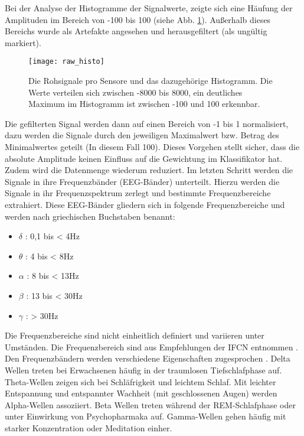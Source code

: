 Bei der Analyse der Histogramme der Signalwerte, zeigte sich eine Häufung der Amplituden im Bereich von -100 bis 100 (siehe Abb. \ref{fig:raw_histo}). Außerhalb dieses Bereichs wurde als Artefakte angesehen und herausgefiltert (als ungültig markiert).

\begin{figure}[h] 
  \begin{center}
    \texttt{[image: raw\_histo]}
    \caption[Rohsignal und Histogramm]{Die Rohsignale pro Sensore und das dazugehörige Histogramm. Die Werte verteilen sich zwischen -8000 bis 8000, ein deutliches Maximum im Histogramm ist zwischen -100 und 100 erkennbar.  \label{fig:raw_histo}}
  \end{center}
\end{figure}

Die gefilterten Signal werden dann auf einen Bereich von -1 bis 1 normalisiert, dazu werden die Signale durch den jeweiligen Maximalwert bzw. Betrag des Minimalwertes geteilt (In diesem Fall 100). Dieses Vorgehen stellt sicher, dass die absolute Amplitude keinen Einfluss auf die Gewichtung im Klassifikator hat. Zudem wird die Datenmenge wiederum reduziert. Im letzten Schritt werden die Signale in ihre Frequenzbänder (EEG-Bänder) unterteilt. Hierzu werden die Signale in ihr Frequenzspektrum zerlegt und bestimmte Frequenzbereiche extrahiert. Diese EEG-Bänder gliedern sich in folgende Frequenzbereiche und werden nach griechischen Buchstaben benannt:
\begin{itemize}
 \item $\delta$ : 0,1 bis < 4Hz
 \item $\theta$ :   4 bis < 8Hz
 \item $\alpha$ :   8 bis < 13Hz
 \item $\beta$  :  13 bis < 30Hz
 \item $\gamma$ :  > 30Hz
\end{itemize}
Die Frequenzbereiche sind nicht einheitlich definiert und variieren unter Umständen. Die Frequenzbereich sind aus Empfehlungen der IFCN entnommen \cite{ifcn}. Den Frequenzbändern werden verschiedene Eigenschaften zugesprochen \cite{lei2011,Lv2010,Gundel1992}. Delta Wellen treten bei Erwachsenen häufig in der traumlosen Tiefschlafphase auf. Theta-Wellen zeigen sich bei Schläfrigkeit und leichtem Schlaf. Mit leichter Entspannung und entspannter Wachheit (mit geschlossenen Augen) werden Alpha-Wellen assoziiert. Beta Wellen treten während der REM-Schlafphase oder unter Einwirkung von Psychopharmaka auf. Gamma-Wellen gehen häufig mit starker Konzentration oder Meditation einher.

